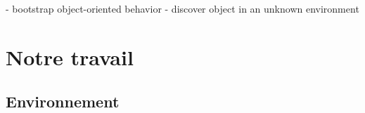 \documentclass{llncs}
\begin{document}
- bootstrap object-oriented behavior
- discover object in an unknown environment













\section{Notre travail}





\subsection{Environnement}
 
\end{document}
